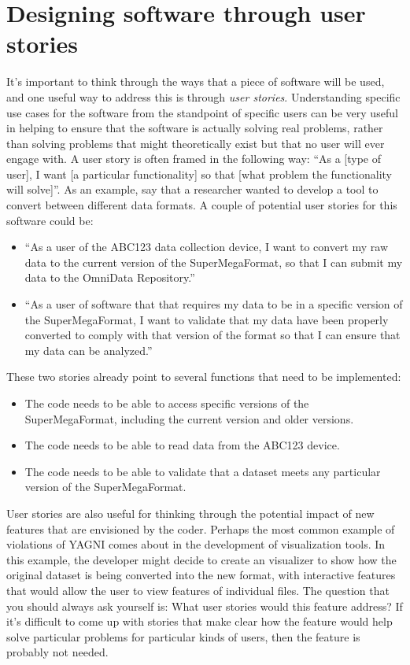 \section{Designing software through user stories}

It's important to think through the ways that a piece of software will be used, and one useful way to address this is through \textit{user stories}.
Understanding specific use cases for the software from the standpoint of specific users can be very useful in helping to ensure that the software is actually solving real problems, rather than solving problems that might theoretically exist but that no user will ever engage with.
A user story is often framed in the following way: ``As a [type of user], I want [a particular functionality] so that [what problem the functionality will solve]''.
As an example, say that a researcher wanted to develop a tool to convert between different data formats.
A couple of potential user stories for this software could be:

\begin{itemize}
\item ``As a user of the ABC123 data collection device, I want to convert my raw data to the current version of the SuperMegaFormat, so that I can submit my data to the OmniData Repository.''
\item ``As a user of software that that requires my data to be in a specific version of the SuperMegaFormat, I want to validate that my data have been properly converted to comply with that version of the format so that I can ensure that my data can be analyzed.''
\end{itemize}

These two stories already point to several functions that need to be implemented:

\begin{itemize}
\item The code needs to be able to access specific versions of the SuperMegaFormat, including the current version and older versions.
\item The code needs to be able to read data from the ABC123 device.
\item The code needs to be able to validate that a dataset meets any particular version of the SuperMegaFormat.
\end{itemize}

User stories are also useful for thinking through the potential impact of new features that are envisioned by the coder.
Perhaps the most common example of violations of YAGNI comes about in the development of visualization tools.
In this example, the developer might decide to create an visualizer to show how the original dataset is being converted into the new format, with interactive features that would allow the user to view features of individual files.
The question that you should always ask yourself is: What user stories would this feature address? If it's difficult to come up with stories that make clear how the feature would help solve particular problems for particular kinds of users, then the feature is probably not needed. 

